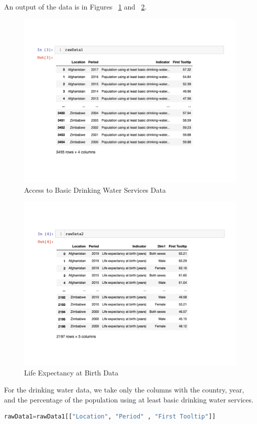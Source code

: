 \documentclass[12pt]{article}
\begin{document}
An output of the data is in Figures ~\ref{fig1} and ~\ref{fig2}.
\begin{figure}
    \centering
    \includegraphics[width=5in]{Figures/data1.pdf}
    \caption{Access to Basic Drinking Water Services Data}
    \label{fig1}
\end{figure}
\begin{figure}
    \centering
    \includegraphics[width=5in]{Figures/data2.pdf}
    \caption{Life Expectancy at Birth Data}
    \label{fig2}
\end{figure}
For the drinking water data, we take only the columns with the country, year, and the percentage of the population using at least basic drinking water services.
\begin{lstlisting}[language=Python]
    rawData1=rawData1[["Location", "Period" , "First Tooltip"]]
\end{lstlisting}
\end{document}
